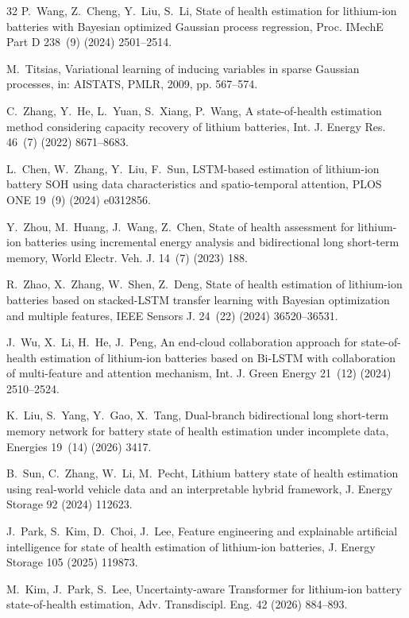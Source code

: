 \documentclass[a4paper,fleqn]{cas-sc}
\begin{document}
\begin{thebibliography}{32}
P.~Wang, Z.~Cheng, Y.~Liu, S.~Li, State of health estimation for lithium-ion batteries with Bayesian optimized Gaussian process regression, Proc. IMechE Part D 238~(9) (2024) 2501--2514.

M.~Titsias, Variational learning of inducing variables in sparse Gaussian processes, in: AISTATS, PMLR, 2009, pp. 567--574.

C.~Zhang, Y.~He, L.~Yuan, S.~Xiang, P.~Wang, A state-of-health estimation method considering capacity recovery of lithium batteries, Int. J. Energy Res. 46~(7) (2022) 8671--8683.

L.~Chen, W.~Zhang, Y.~Liu, F.~Sun, LSTM-based estimation of lithium-ion battery SOH using data characteristics and spatio-temporal attention, PLOS ONE 19~(9) (2024) e0312856.

Y.~Zhou, M.~Huang, J.~Wang, Z.~Chen, State of health assessment for lithium-ion batteries using incremental energy analysis and bidirectional long short-term memory, World Electr. Veh. J. 14~(7) (2023) 188.

R.~Zhao, X.~Zhang, W.~Shen, Z.~Deng, State of health estimation of lithium-ion batteries based on stacked-LSTM transfer learning with Bayesian optimization and multiple features, IEEE Sensors J. 24~(22) (2024) 36520--36531.

J.~Wu, X.~Li, H.~He, J.~Peng, An end-cloud collaboration approach for state-of-health estimation of lithium-ion batteries based on Bi-LSTM with collaboration of multi-feature and attention mechanism, Int. J. Green Energy 21~(12) (2024) 2510--2524.

K.~Liu, S.~Yang, Y.~Gao, X.~Tang, Dual-branch bidirectional long short-term memory network for battery state of health estimation under incomplete data, Energies 19~(14) (2026) 3417.

B.~Sun, C.~Zhang, W.~Li, M.~Pecht, Lithium battery state of health estimation using real-world vehicle data and an interpretable hybrid framework, J. Energy Storage 92 (2024) 112623.

J.~Park, S.~Kim, D.~Choi, J.~Lee, Feature engineering and explainable artificial intelligence for state of health estimation of lithium-ion batteries, J. Energy Storage 105 (2025) 119873.

M.~Kim, J.~Park, S.~Lee, Uncertainty-aware Transformer for lithium-ion battery state-of-health estimation, Adv. Transdiscipl. Eng. 42 (2026) 884--893.


\end{thebibliography}
\end{document}

